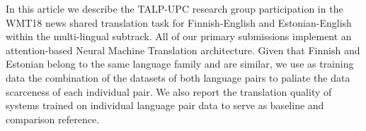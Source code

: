 In this article we describe the TALP-UPC research group participation in the WMT18 news shared translation task for Finnish-English and Estonian-English within the multi-lingual subtrack. All of our primary submissions implement an attention-based Neural Machine Translation architecture. Given that Finnish and Estonian belong to the same language family and are similar, we use as training data the combination of the datasets of both language pairs to paliate the data scarceness of each individual pair. We also report the translation quality of systems trained on individual language pair data to serve as baseline and comparison reference.
